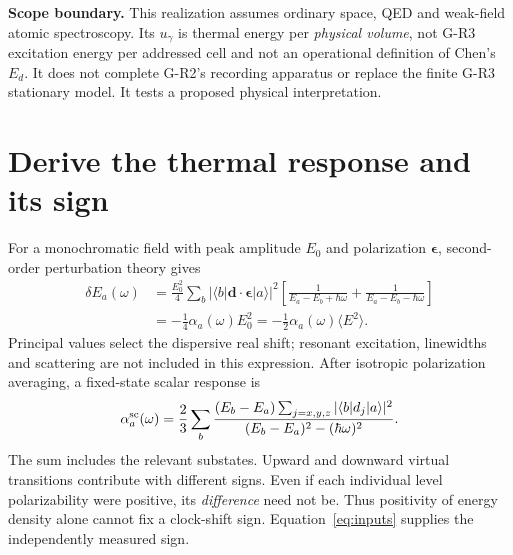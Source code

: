 \documentclass[11pt,a4paper]{article}
\begin{document}
\textbf{Scope boundary.} This realization assumes ordinary space,
QED and weak-field atomic spectroscopy. Its $u_\gamma$ is thermal
energy per \emph{physical volume}, not G-R3 excitation energy per
addressed cell and not an operational definition of Chen's $E_d$.
It does not complete G-R2's recording apparatus or replace the finite
G-R3 stationary model. It tests a proposed physical interpretation.

\newpage
\section{Derive the thermal response and its sign}
For a monochromatic field with peak amplitude $E_0$ and polarization
$\boldsymbol\epsilon$, second-order perturbation theory gives
\begin{align}
 \delta E_a(\omega)
 &=\frac{E_0^2}{4}\sum_b |\langle b|\mathbf d\cdot
 \boldsymbol\epsilon|a\rangle|^2
 \left[\frac{1}{E_a-E_b+\hbar\omega}
       +\frac{1}{E_a-E_b-\hbar\omega}\right]\\
 &=-\frac14\alpha_a(\omega)E_0^2
  =-\frac12\alpha_a(\omega)\langle E^2\rangle .\label{eq:stark}
\end{align}
Principal values select the dispersive real shift; resonant excitation,
linewidths and scattering are not included in this expression.
After isotropic polarization averaging, a fixed-state scalar response is
\begin{equation}\label{eq:alpha}
 \alpha_a^{\rm sc}(\omega)=\frac23\sum_b
 \frac{(E_b-E_a)\sum_{j=x,y,z}|\langle b|d_j|a\rangle|^2}
 {(E_b-E_a)^2-(\hbar\omega)^2} .
\end{equation}
The sum includes the relevant substates. Upward and downward virtual
transitions contribute with different signs. Even if each individual
level polarizability were positive, its \emph{difference} need not be.
Thus positivity of energy density alone cannot fix a clock-shift sign.
Equation~\eqref{eq:inputs} supplies the independently measured sign.
\end{document}
